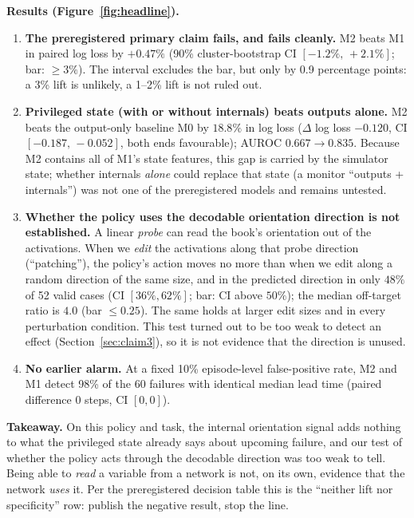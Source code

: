 \documentclass[11pt,a4paper]{article}
\newcommand{\Mz}{M0}\newcommand{\Mo}{M1}\newcommand{\Mt}{M2}
\begin{document}
\textbf{Results (Figure~\ref{fig:headline}).}
\begin{enumerate}
\item \textbf{The preregistered primary claim fails, and fails cleanly.} \Mt{} beats \Mo{} in paired log loss by $+0.47\%$ (90\% cluster-bootstrap CI $[-1.2\%,\,+2.1\%]$; bar: $\geq 3\%$). The interval excludes the bar, but only by 0.9 percentage points: a 3\% lift is unlikely, a 1--2\% lift is not ruled out.
\item \textbf{Privileged state (with or without internals) beats outputs alone.} \Mt{} beats the output-only baseline \Mz{} by $18.8\%$ in log loss ($\Delta$ log loss $-0.120$, CI $[-0.187,\,-0.052]$, both ends favourable); AUROC $0.667 \to 0.835$. Because \Mt{} contains all of \Mo{}'s state features, this gap is carried by the simulator state; whether internals \emph{alone} could replace that state (a monitor ``outputs + internals'') was not one of the preregistered models and remains untested.
\item \textbf{Whether the policy uses the decodable orientation direction is not established.} A linear \emph{probe} can read the book's orientation out of the activations. When we \emph{edit} the activations along that probe direction (``patching''), the policy's action moves no more than when we edit along a random direction of the same size, and in the predicted direction in only $48\%$ of 52 valid cases (CI $[36\%,62\%]$; bar: CI above $50\%$); the median off-target ratio is $4.0$ (bar $\leq 0.25$). The same holds at larger edit sizes and in every perturbation condition. This test turned out to be too weak to detect an effect (Section~\ref{sec:claim3}), so it is not evidence that the direction is unused.
\item \textbf{No earlier alarm.} At a fixed 10\% episode-level false-positive rate, \Mt{} and \Mo{} detect 98\% of the 60 failures with identical median lead time (paired difference $0$ steps, CI $[0,0]$).
\end{enumerate}

\textbf{Takeaway.} On this policy and task, the internal orientation signal adds nothing to what the privileged state already says about upcoming failure, and our test of whether the policy acts through the decodable direction was too weak to tell. Being able to \emph{read} a variable from a network is not, on its own, evidence that the network \emph{uses} it. Per the preregistered decision table this is the ``neither lift nor specificity'' row: publish the negative result, stop the line.
\end{document}

